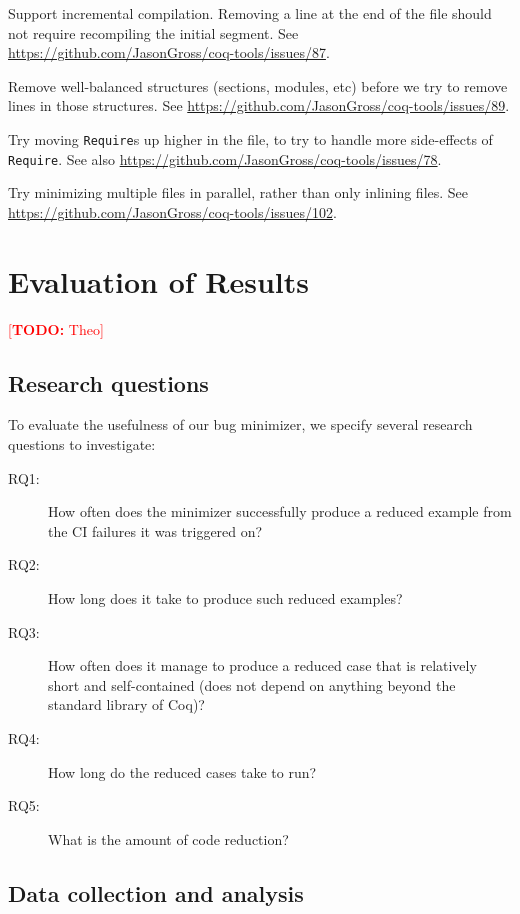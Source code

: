 \documentclass[a4paper,USenglish,cleveref,autoref,thm-restate]{lipics-v2021}
\makeatletter
\newcommand{\todo}[1]{%
\@latex@warning{TODO: \detokenize{#1} on page \thepage}%
\textcolor{red}{[\textbf{TODO:} #1]}}%
\makeatother
\begin{document}
Support incremental compilation.
Removing a line at the end of the file should not require recompiling the initial segment.
See \url{https://github.com/JasonGross/coq-tools/issues/87}.

Remove well-balanced structures (sections, modules, etc) before we try to remove lines in those structures.
See \url{https://github.com/JasonGross/coq-tools/issues/89}.

Try moving \texttt{Require}s up higher in the file, to try to handle more side-effects of \texttt{Require}.
See also \url{https://github.com/JasonGross/coq-tools/issues/78}.

Try minimizing multiple files in parallel, rather than only inlining files.
See \url{https://github.com/JasonGross/coq-tools/issues/102}.

\section{Evaluation of Results}

\todo{Theo}

\subsection{Research questions}

To evaluate the usefulness of our bug minimizer, we specify several research questions to investigate:

\begin{description}
\item[RQ1:] How often does the minimizer successfully produce a reduced example from the CI failures it was triggered on?
\item[RQ2:] How long does it take to produce such reduced examples?
\item[RQ3:] How often does it manage to produce a reduced case that is relatively short and self-contained (does not depend on anything beyond the standard library of Coq)?
\item[RQ4:] How long do the reduced cases take to run?
\item[RQ5:] What is the amount of code reduction?
\end{description}

\subsection{Data collection and analysis}
\end{document}
